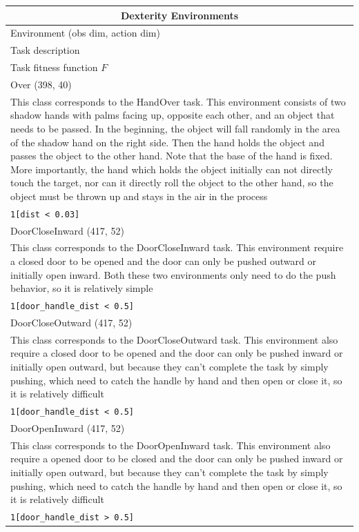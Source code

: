 \begin{tabularx}{\textwidth}{X}
    \toprule
    \multicolumn{1}{c}{Dexterity Environments} \\[1px]
    \hline
    Environment (obs dim, action dim) \\ Task description \\ Task fitness function $F$ \\
    \hline
    Over (398, 40) \\ This class corresponds to the HandOver task. This environment consists of two shadow hands with palms facing up, opposite each other, and an object that needs to be passed. In the beginning, the object will fall randomly in the area of the shadow hand on the right side. Then the hand  holds the object and passes the object to the other hand. Note that the base of the hand is  fixed. More importantly, the hand which holds the object initially can not directly touch the  target, nor can it directly roll the object to the other hand, so the object must be thrown up and stays in the air in the process \\ \verb|1[dist < 0.03]| \\[1px]
    \hline
    DoorCloseInward (417, 52) \\ This class corresponds to the DoorCloseInward task. This environment require a closed door to be opened and the door can only be pushed outward or initially open inward. Both these two environments only need to do the push behavior, so it is relatively simple \\ \verb|1[door_handle_dist < 0.5]| \\[1px]
    \hline
    DoorCloseOutward (417, 52) \\ This class corresponds to the DoorCloseOutward task. This environment also require a closed door  to be opened and the door can only be pushed inward or initially open outward, but because they  can't complete the task by simply pushing, which need to catch the handle by hand and then open or close it, so it is relatively difficult \\ \verb|1[door_handle_dist < 0.5]| \\[1px]
    \hline
    DoorOpenInward (417, 52) \\ This class corresponds to the DoorOpenInward task. This environment also require a opened door  to be closed and the door can only be pushed inward or initially open outward, but because they  can't complete the task by simply pushing, which need to catch the handle by hand and then open or close it, so it is relatively difficult \\ \verb|1[door_handle_dist > 0.5]| \\[1px]

\end{tabularx}
